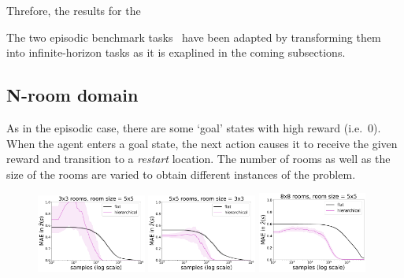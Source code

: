  Threfore, the results for the 

The two episodic benchmark tasks~\citep{Infante2022} have been adapted by transforming them into infinite-horizon tasks as it is exaplined in the coming subsections.

  \subsection{N-room domain}
 As in the episodic case, there are some `goal' states with high reward (i.e.~0). When the agent enters a goal state, the next action causes it to receive the given reward and transition to a {\it restart\/} location. The number of rooms as well as the size of the rooms are varied to obtain different instances of the problem.

  \begin{figure}
  \centering
  \includegraphics*[width=0.32\textwidth]{figures/chapter2/online/nrooms_3_3.pdf}
  \includegraphics*[width=0.32\textwidth]{figures/chapter2/online/nrooms_5_5.pdf}
  \includegraphics*[width=0.32\textwidth]{figures/chapter2/online/nrooms_8_8.pdf}


\end{figure}
